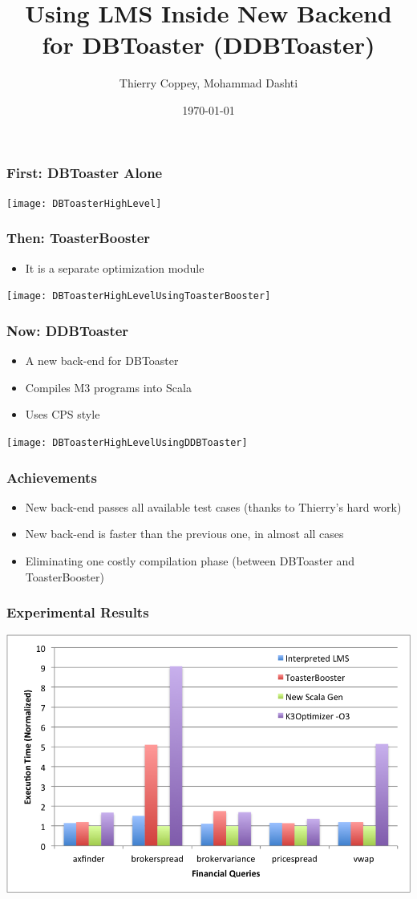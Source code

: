 \documentclass[14pt]{beamer}
\title[ToasterBooster]{Using LMS Inside New Backend for DBToaster (DDBToaster)}
\author{Thierry Coppey, Mohammad Dashti}
\institute[EPFL]
{
Ecole Polytechnique Federale de Lausanne\\
\medskip
{\emph{[first.last]@epfl.ch}}
}
\date{\today}
\begin{document}
%
\begin{frame}
\titlepage
\end{frame}
%

%
\begin{frame}
\frametitle{First: DBToaster Alone}
\texttt{[image: DBToasterHighLevel]}
\end{frame}
%

%
\begin{frame}
\frametitle{Then: ToasterBooster}
\fontsize{18pt}{12}\selectfont
\begin{itemize}
\item It is a separate optimization module
\end{itemize}
\texttt{[image: DBToasterHighLevelUsingToasterBooster]}
\end{frame}
%

%
\begin{frame}
\frametitle{Now: DDBToaster}
\fontsize{18pt}{12}\selectfont
\begin{itemize}
\item A new back-end for DBToaster
\item Compiles M3 programs into Scala
\item Uses CPS style
\end{itemize}
\texttt{[image: DBToasterHighLevelUsingDDBToaster]}
\end{frame}
%

%
\begin{frame}
\frametitle{Achievements}
\begin{itemize}
\item New back-end passes all available test cases (thanks to Thierry's hard work)
\item New back-end is faster than the previous one, in almost all cases
\item Eliminating one costly compilation phase (between DBToaster and ToasterBooster)

\end{itemize}
\end{frame}

%
\begin{frame}
\frametitle{Experimental Results}

\includegraphics[width=\textwidth]{finance-large}

\end{frame}
\end{document}

